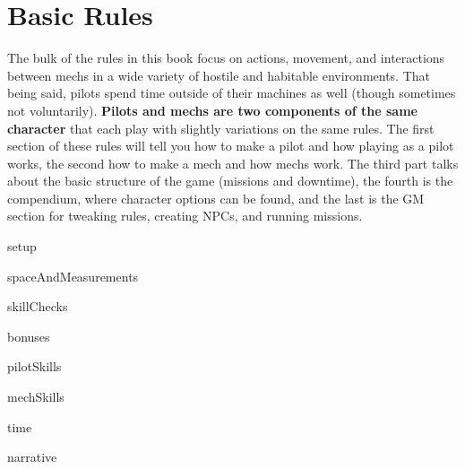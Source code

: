 \chapter{Basic Rules}

The bulk of the rules in this book focus on actions, movement, and interactions between mechs
in a wide variety of hostile and habitable environments. That being said, pilots spend time
outside of their machines as well (though sometimes not voluntarily). \textbf{Pilots and mechs are two
components of the same character} that each play with slightly variations on the same rules.
The first section of these rules will tell you how to make a pilot and how playing as a pilot works,
the second how to make a mech and how mechs work. The third part talks about the basic
structure of the game (missions and downtime), the fourth is the compendium, where character
options can be found, and the last is the GM section for tweaking rules, creating NPCs, and
running missions.

{setup}

{spaceAndMeasurements}

{skillChecks}

{bonuses}

{pilotSkills}

{mechSkills}

{time}

{narrative}


